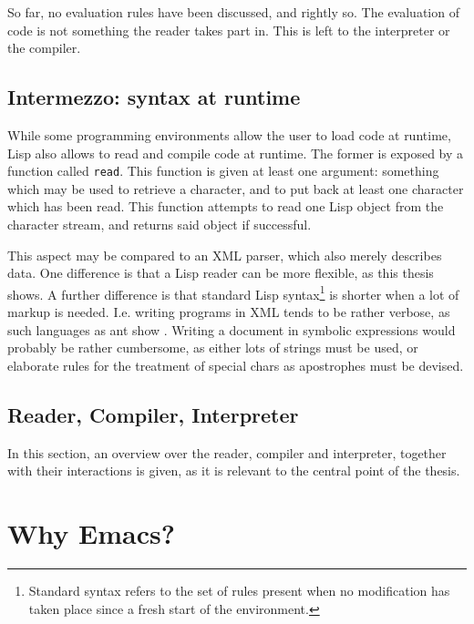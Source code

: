 \documentclass[a4paper]{article}
\newcommand{\fun}[1]{\texttt{#1}}
\begin{document}
So far, no evaluation rules have been discussed, and rightly so.  The evaluation
of code is not something the reader takes part in.  This is left to the
interpreter or the compiler.

\subsection{Intermezzo: syntax at runtime}
\label{subsec:intermezzo:syntax-at-runtime}

While some programming environments allow the user to load code at runtime, Lisp
also allows to read and compile code at runtime.  The former is exposed by a
function called \fun{read}.  This function is given at least one argument:
something which may be used to retrieve a character, and to put back at least
one character which has been read.  This function attempts to read one Lisp
object from the character stream, and returns said object if successful.

This aspect may be compared to an XML parser, which also merely describes data.
One difference is that a Lisp reader can be more flexible, as this thesis shows.
A further difference is that standard Lisp syntax\footnote{Standard syntax
  refers to the set of rules present when no modification has taken place since
  a fresh start of the environment.} is shorter when a lot of markup is needed.
I.e. writing programs in XML tends to be rather verbose, as such languages as
ant show \cite{ant}.  Writing a document in symbolic expressions would probably
be rather cumbersome, as either lots of strings must be used, or elaborate rules
for the treatment of special chars as apostrophes must be devised.

\subsection{Reader, Compiler, Interpreter}
\label{subsec:reader-compiler-interpreter}

In this section, an overview over the reader, compiler and interpreter, together
with their interactions is given, as it is relevant to the central point of the
thesis.

\section{Why Emacs?}
\label{sec:why-emacs}
\end{document}
